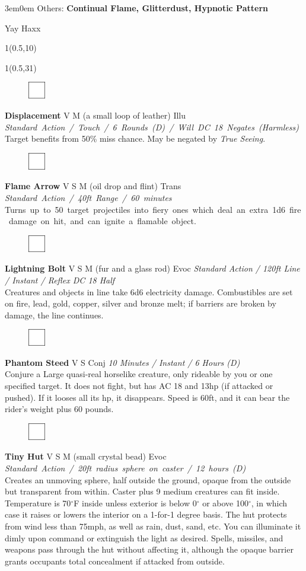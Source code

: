 \documentclass[letterpaper]{article}
\newcommand{\spell}[7]{
\begin{figure}
\vspace{-13pt}
\ifstrequal{#2}{Full}{  \includegraphics[width=2em]{Checkbox-Full}}{
\ifstrequal{#2}{Scroll}{\includegraphics[width=2em]{Checkbox-S}}{
                        \includegraphics[width=2em]{Checkbox}}}
\ifstrequal{#7}{}{\vspace{-1em}}{\vspace{#7}}
\end{figure}
\noindent \textbf{#1} #3 {
    \ifstrequal{#4}{Conj}{\color{Plum}Conj}{%
    \ifstrequal{#4}{Divin}{\color{YellowOrange}Divin}{%
    \ifstrequal{#4}{Ench}{\color{VioletRed}Ench}{%
    \ifstrequal{#4}{Trans}{\color{LimeGreen}Trans}{%
    \ifstrequal{#4}{Evoc}{\color{RedOrange}Evoc}{%
    \ifstrequal{#4}{Illu}{\color{ProcessBlue}Illu}{%
    \ifstrequal{#4}{Abjur}{\color{CadetBlue}Abjur}{%
    \ifstrequal{#4}{Necro}{\color{Red}Necro}{%
}}}}}}}}}
{\footnotesize \emph{#5}} \\
#6
}
\newcommand{\spelllevel}[2]{
\begin{textblock}{1}(0.5,#1)
\begin{sideways}
    \noindent {\color{light-gray}{\LARGE \emph{#2}}}
\end{sideways}
\end{textblock}}
\begin{document}
\begin{adjustwidth}{3em}{0em}
Others: \textbf{Continual Flame, Glitterdust, Hypnotic Pattern} \\[-2em]
\end{adjustwidth}

\pagebreak
{\color{White} Yay Haxx}\\[-2em]

\spelllevel{10}{Third: 3/day}
\spelllevel{31}{Fourth: 2/day}

\spell{Displacement}{}{V M (a small loop of leather)}{Illu}{\mbox{Standard Action / Touch / 6 Rounds (D) / Will DC 18 Negates (Harmless)}}{%
Target benefits from 50\% miss chance. May be negated by \emph{True Seeing}.}{}\\[-1em] %

\spell{Flame Arrow}{}{V S M (oil drop and flint)}{Trans}{\mbox{Standard Action / 40ft Range / 60 minutes}}{%
\mbox{Turns up to 50 target projectiles into fiery ones which deal an extra 1d6 fire damage on hit, and can ignite a flamable object.}}{}\\[-1em] %

\spell{Lightning Bolt}{}{V S M (fur and a glass rod)}{Evoc}{Standard Action / 120ft Line / Instant / Reflex DC 18 Half}{%
Creatures and objects in line take 6d6 electricity damage. Combustibles are set on fire, lead, gold, copper, silver and bronze melt; if barriers are broken by damage, the line continues.}{} %

\spell{Phantom Steed}{}{V S}{Conj}{10 Minutes / Instant / 6 Hours (D)}{%
Conjure a Large quasi-real horselike creature, only rideable by you or one specified target. It does not fight, but has AC 18 and 13hp (if attacked or pushed).  If it looses all its hp, it disappears.  Speed is 60ft, and it can bear the rider's weight plus 60 pounds.}{1em}\\[-1em] %

\spell{Tiny Hut}{}{V S M (small crystal bead)}{Evoc}{\mbox{Standard Action / 20ft radius sphere on caster /  12 hours (D)}}{%
Creates an unmoving sphere, half outside the ground, opaque from the outside but transparent from within.  Caster plus 9 medium creatures can fit inside.  Temperature is 70$^{\circ}$F inside unless exterior is below 0$^{\circ}$ or above 100$^{\circ}$, in which case it raises or lowers the interior on a 1-for-1 degree basis.  The hut protects from wind less than 75mph, as well as rain, dust, sand, etc.  You can illuminate it dimly upon command or extinguish the light as desired.  Spells, missiles, and weapons pass through the hut without affecting it, although the opaque barrier grants occupants total concealment if attacked from outside.}{2em} %
\end{document}
